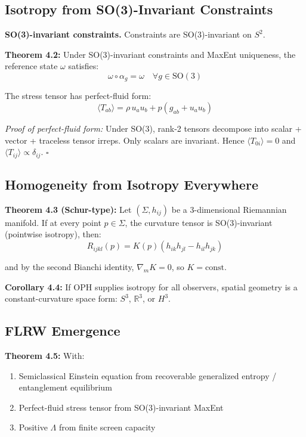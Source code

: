 \subsection{Isotropy from SO(3)-Invariant Constraints}\label{42-isotropy-from-so3-invariant-constraints}

\textbf{SO(3)-invariant constraints.} Constraints are SO(3)-invariant on \(S^2\).

\textbf{Theorem 4.2:} Under SO(3)-invariant constraints and MaxEnt uniqueness, the reference state \(\omega\) satisfies: \[\omega \circ \alpha_g = \omega \quad \forall g \in \text{SO}(3)\]

The stress tensor has perfect-fluid form: \[\langle T_{ab} \rangle = \rho \, u_a u_b + p(g_{ab} + u_a u_b)\]

\emph{Proof of perfect-fluid form:} Under SO(3), rank-2 tensors decompose into scalar + vector + traceless tensor irreps. Only scalars are invariant. Hence \(\langle T_{0i} \rangle = 0\) and \(\langle T_{ij} \rangle \propto \delta_{ij}\). \(\square\)

\subsection{Homogeneity from Isotropy Everywhere}\label{43-homogeneity-from-isotropy-everywhere}

\textbf{Theorem 4.3 (Schur-type):} Let \((\Sigma, h_{ij})\) be a 3-dimensional Riemannian manifold. If at every point \(p \in \Sigma\), the curvature tensor is SO(3)-invariant (pointwise isotropy), then: \[R_{ijkl}(p) = K(p)(h_{ik}h_{jl} - h_{il}h_{jk})\]

and by the second Bianchi identity, \(\nabla_m K = 0\), so \(K = \text{const}\).

\textbf{Corollary 4.4:} If OPH supplies isotropy for all observers, spatial geometry is a constant-curvature space form: \(S^3\), \(\mathbb{R}^3\), or \(H^3\).

\subsection{FLRW Emergence}\label{44-flrw-emergence}

\textbf{Theorem 4.5:} With:

\begin{enumerate}
\def\labelenumi{\arabic{enumi}.}
\tightlist
\item
 Semiclassical Einstein equation from recoverable generalized entropy / entanglement equilibrium
\item
 Perfect-fluid stress tensor from SO(3)-invariant MaxEnt
\item
 Positive \(\Lambda\) from finite screen capacity
\end{enumerate}

